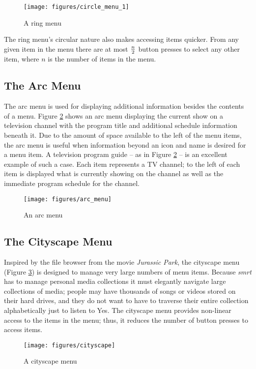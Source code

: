 \documentclass[letterpaper, notitlepage, 11pt]{article}
\begin{document}
\begin{figure}[htb]
\centering
\texttt{[image: figures/circle\_menu\_1]}
\caption{A ring menu\label{fig:ringmenu}}
\end{figure}

The ring menu's circular nature also makes accessing items quicker.  From any
given item in the menu there are at most $n \over 2$ button presses to select
any other item, where $n$ is the number of items in the menu.

\subsection{The Arc Menu}
The arc menu is used for displaying additional information besides the contents
of a menu.  Figure \ref{fig:arcmenu} shows an arc menu displaying the current
show on a television channel with the program title and additional schedule
information beneath it.  Due to the amount of space available to the left of the
menu items, the arc menu is useful when information beyond an icon and name is
desired for a menu item.  A television program guide -- as in Figure
\ref{fig:arcmenu} -- is an excellent example of such a case.  Each item
represents a TV channel; to the left of each item is displayed what is currently
showing on the channel as well as the immediate program schedule for the
channel.

\begin{figure}[htb]
\centering
\texttt{[image: figures/arc\_menu]}
\caption{An arc menu\label{fig:arcmenu}}
\end{figure}

\subsection{The Cityscape Menu}
Inspired by the file browser from the movie \textit{Jurassic Park}, the
cityscape menu (Figure \ref{fig:cityscape}) is designed to manage very large
numbers of menu items.  Because \textit{smrt} has to manage personal media
collections it must elegantly navigate large collections of media; people may
have thousands of songs or videos stored on their hard drives, and they do not
want to have to traverse their entire collection alphabetically just to listen
to Yes.  The cityscape menu provides non-linear access to the items in the menu;
thus, it reduces the number of button presses to access items.

\begin{figure}[htb]
\centering
\texttt{[image: figures/cityscape]}
\caption{A cityscape menu\label{fig:cityscape}}
\end{figure}
\end{document}
